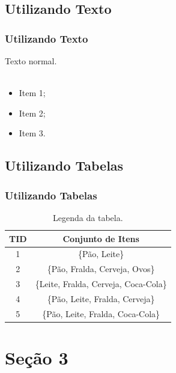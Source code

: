 \documentclass{beamer}
\begin{document}
\subsection{Utilizando Texto}
\begin{frame}\frametitle{Utilizando Texto}
\justify Texto normal.
\\~\\
\begin{itemize}
\item Item 1;
\item Item 2;
\item Item 3.	
\end{itemize}
\end{frame}

\subsection{Utilizando Tabelas}
\begin{frame}\frametitle{Utilizando Tabelas}
\begin{table}[h]
\centering
\begin{tabular}{c|c}
\hline
\textbf{\small TID} & \textbf{\small Conjunto de Itens}\\\hline \hline
{\small 1} & {\small \{Pão, Leite\}}\\\hline
{\small 2} & {\small \{Pão, Fralda, Cerveja, Ovos\}}\\\hline
{\small 3} & {\small \{Leite, Fralda, Cerveja, Coca-Cola\}}\\\hline
{\small 4} & {\small \{Pão, Leite, Fralda, Cerveja\}}\\\hline
{\small 5} & {\small \{Pão, Leite, Fralda, Coca-Cola\}}\\\hline
\end{tabular}
\caption{Legenda da tabela.}
\label{t.transacao_mercado}
\end{table}
\end{frame}

\section{Seção 3}
\end{document}
